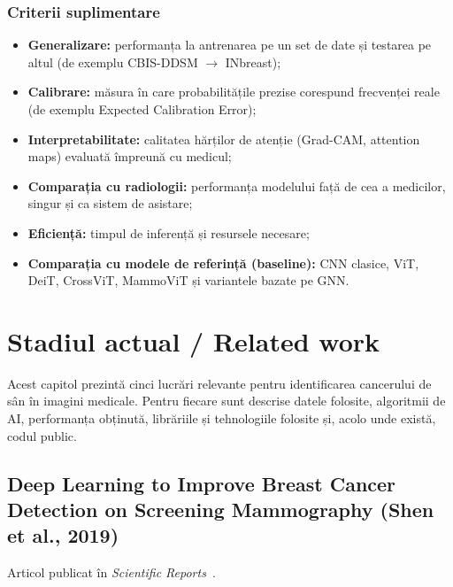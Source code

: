 \documentclass[runningheads,a4paper,11pt]{report}
\begin{document}
\subsection{Criterii suplimentare}

\begin{itemize}
	\item \textbf{Generalizare:} performanța la antrenarea pe un set de date și testarea pe altul (de exemplu CBIS-DDSM $\rightarrow$ INbreast);
	\item \textbf{Calibrare:} măsura în care probabilitățile prezise corespund frecvenței reale (de exemplu Expected Calibration Error);
	\item \textbf{Interpretabilitate:} calitatea hărților de atenție (Grad-CAM, attention maps) evaluată împreună cu medicul;
	\item \textbf{Comparația cu radiologii:} performanța modelului față de cea a medicilor, singur și ca sistem de asistare;
	\item \textbf{Eficiență:} timpul de inferență și resursele necesare;
	\item \textbf{Comparația cu modele de referință (baseline):} CNN clasice, ViT, DeiT, CrossViT, MammoViT și variantele bazate pe GNN.
\end{itemize}


\chapter{Stadiul actual / Related work}
\label{chapter:stateOfArt}

Acest capitol prezintă cinci lucrări relevante pentru identificarea cancerului de sân în imagini medicale. Pentru fiecare sunt descrise datele folosite, algoritmii de AI, performanța obținută, librăriile și tehnologiile folosite și, acolo unde există, codul public.

\section{Deep Learning to Improve Breast Cancer Detection on Screening Mammography (Shen et al., 2019)}
\label{section:shen}

Articol publicat în \emph{Scientific Reports}~\cite{shen2019}.
\end{document}
